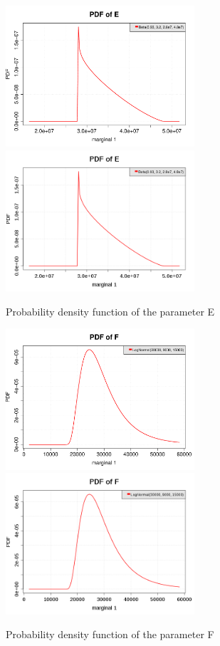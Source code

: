 \documentclass[11pt]{article}
\begin{document}
\begin{figure}[Hhbtp]
  \begin{minipage}{9.8cm}
    \begin{center}
      \ifpdf
      \includegraphics[width=7cm]{distributionE_pdf.pdf}
      \else
      \includegraphics[width=7cm]{distributionE_pdf.png}
      \fi
      \caption{Probability density function of the parameter E}
      \label{pdfE}
    \end{center}
  \end{minipage}
  \hfill
  \begin{minipage}{9.8cm}
    \begin{center}
      \ifpdf
      \includegraphics[width=7cm]{distributionF_pdf.pdf}
      \else
      \includegraphics[width=7cm]{distributionF_pdf.png}
      \fi
      \caption{Probability density function of the parameter F}
      \label{pdfF}
    \end{center}
  \end{minipage}
\end{figure}
\end{document}
